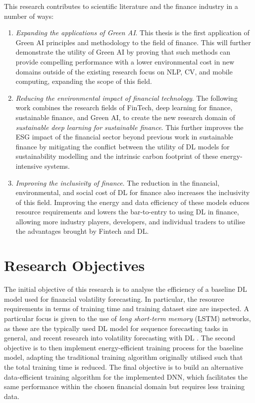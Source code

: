 \documentclass[a4paper, 11pt]{report}
\begin{document}
    This research contributes to scientific literature and the finance industry in a number of ways:

    \begin{enumerate}
        \item \emph{Expanding the applications of Green AI}. This thesis is the first application of Green AI principles and methodology to the field of finance. This will further demonstrate the utility of Green AI by proving that such methods can provide compelling performance with a lower environmental cost in new domains outside of the existing research focus on NLP, CV, and mobile computing, expanding the scope of this field.
        \item \emph{Reducing the environmental impact of financial technology}. The following work combines the research fields of FinTech, deep learning for finance, sustainable finance, and Green AI, to create the new research domain of \emph{sustainable deep learning for sustainable finance}. This further improves the ESG impact of the financial sector beyond previous work in sustainable finance by mitigating the conflict between the utility of DL models for sustainability modelling and the intrinsic carbon footprint of these energy-intensive systems.
        \item \emph{Improving the inclusivity of finance}. The reduction in the financial, environmental, and social cost of DL for finance also increases the inclusivity of this field. Improving the energy and data efficiency of these models educes resource requirements and lowers the bar-to-entry to using DL in finance, allowing more industry players, developers, and individual traders to utilise the advantages brought by Fintech and DL.
    \end{enumerate}


    \section{Research Objectives}

    The initial objective of this research is to analyse the efficiency of a baseline DL model used for financial volatility forecasting. In particular, the resource requirements in terms of training time and training dataset size are inspected. A particular focus is given to the use of \emph{long short-term memory} (LSTM) networks, as these are the typically used DL model for sequence forecasting tasks in general, and recent research into volatility forecasting with DL \citep{xiong-2015}. The second objective is to then implement energy-efficient training process for the baseline model, adapting the traditional training algorithm originally utilised such that the total training time is reduced. The final objective is to build an alternative data-efficient training algorithm for the implemented DNN, which facilitates the same performance within the chosen financial domain but requires less training data.
\end{document}
